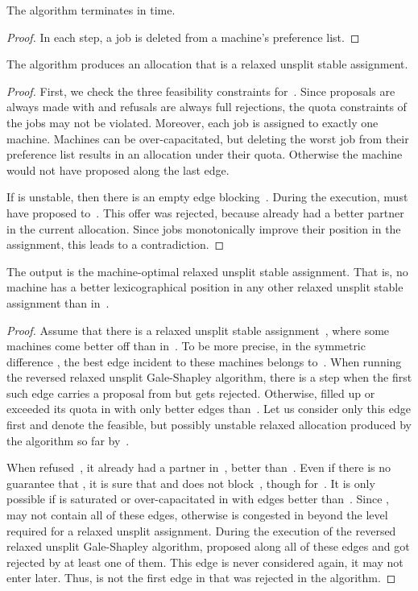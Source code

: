 \documentclass{llncs}
\begin{document}
\begin{claim}
The algorithm terminates in  time.
\end{claim}

\begin{proof}
In each step, a job is deleted from a machine's preference
list. 
\end{proof}

\begin{claim}
The algorithm produces an allocation  that is a relaxed unsplit
stable assignment.
\end{claim}

\begin{proof}
First, we check the three feasibility constraints for~. Since
proposals are always made with  and refusals are always full
rejections, the quota constraints of the jobs may not be
violated. Moreover, each job is assigned to exactly one
machine. Machines can be over-capacitated, but deleting the worst job
from their preference list results in an allocation under their quota. Otherwise the machine would not have proposed along
the last edge.
	
If  is unstable, then there is an empty edge 
blocking~. During the execution,  must have proposed
to~. This offer was rejected, because  already had a better
partner in the current allocation. Since jobs monotonically improve
their position in the assignment, this leads to a contradiction.
\end{proof}

\begin{claim}
The output  is the machine-optimal relaxed unsplit stable
assignment. That is, no machine has a better lexicographical position
in any other relaxed unsplit stable assignment than in~.
\end{claim}

\begin{proof}
Assume that there is a relaxed unsplit stable assignment~, where
some machines come better off than in~. To be more precise, in the
symmetric difference , the best edge incident to these
machines belongs to~. When running the reversed relaxed unsplit
Gale-Shapley algorithm, there is a step when the first such edge
 carries a proposal from  but gets rejected. Otherwise,
 filled up or exceeded its quota in  with only better edges
than~. Let us consider only this edge first and denote the
feasible, but possibly unstable relaxed allocation produced by the
algorithm so far by~.

When  refused~, it already had a partner  in~,
better than~. Even if there is no guarantee that , it
is sure that  and  does not block~, though
 for~. It is
only possible if  is saturated or over-capacitated in  with
edges better than~. Since ,  may not contain
all of these edges, otherwise  is congested in  beyond the
level required for a relaxed unsplit assignment. During the execution
of the reversed relaxed unsplit Gale-Shapley algorithm,  proposed
along all of these edges and got rejected by at least one of
them. This edge is never considered again, it may not enter 
later. Thus,  is not the first edge in  that was
rejected in the algorithm.
\end{proof}
\end{document}
